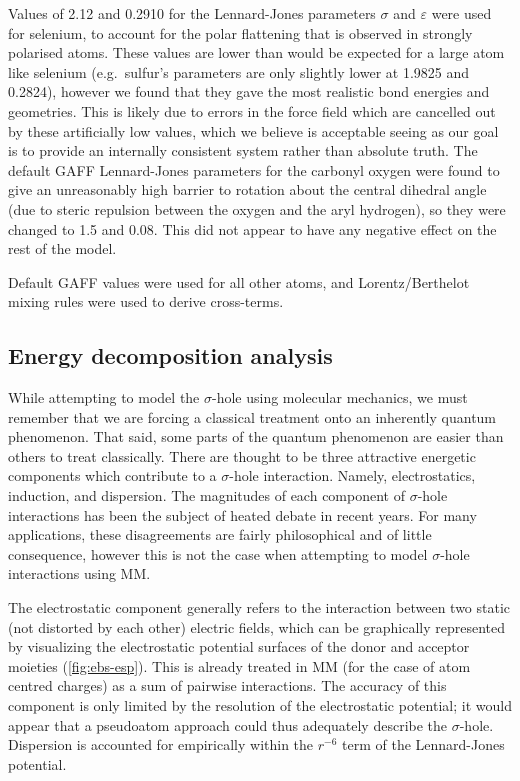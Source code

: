 \begin{refsection}
Values of 2.12 and 0.2910 for the Lennard-Jones parameters $ \sigma $ and $ \varepsilon $ were used for selenium, to account for the polar flattening that is observed in strongly polarised atoms.
These values are lower than would be expected for a large atom like selenium (e.g.\ sulfur's parameters are only slightly lower at 1.9825 and 0.2824), however we found that they gave the most realistic bond energies and geometries.
This is likely due to errors in the force field which are cancelled out by these artificially low values, which we believe is acceptable seeing as our goal is to provide an internally consistent system rather than absolute truth. 
The default GAFF Lennard-Jones parameters for the carbonyl oxygen were found to give an unreasonably high barrier to rotation about the central dihedral angle (due to steric repulsion between the oxygen and the aryl hydrogen), so they were changed to 1.5 and 0.08.
This did not appear to have any negative effect on the rest of the model.

Default GAFF values were used for all other atoms, and Lorentz/Berthelot mixing rules were used to derive cross-terms.

\subsection{Energy decomposition analysis}
While attempting to model the $ \sigma $-hole using molecular mechanics, we must remember that we are forcing a classical treatment onto an inherently quantum phenomenon.
That said, some parts of the quantum phenomenon are easier than others to treat classically.
There are thought to be three attractive energetic components which contribute to a $ \sigma $-hole interaction.
Namely, electrostatics, induction, and dispersion.\autocite{Bleiholder2006,Bleiholder2007,Pascoe2017}
The magnitudes of each component of $ \sigma $-hole interactions has been the subject of heated debate in recent years.
For many applications, these disagreements are fairly philosophical and of little consequence, however this is not the case when attempting to model $ \sigma $-hole interactions using MM.\@

The electrostatic component generally refers to the interaction between two static (not distorted by each other) electric fields, which can be graphically represented by visualizing the electrostatic potential surfaces of the donor and acceptor moieties (\cref{fig:ebs-esp}).
This is already treated in MM (for the case of atom centred charges) as a sum of pairwise interactions.
The accuracy of this component is only limited by the resolution of the electrostatic potential; it would appear that a pseudoatom approach could thus adequately describe the $ \sigma $-hole.
Dispersion is accounted for empirically within the $ r^{-6} $ term of the Lennard-Jones potential.


\end{refsection}
